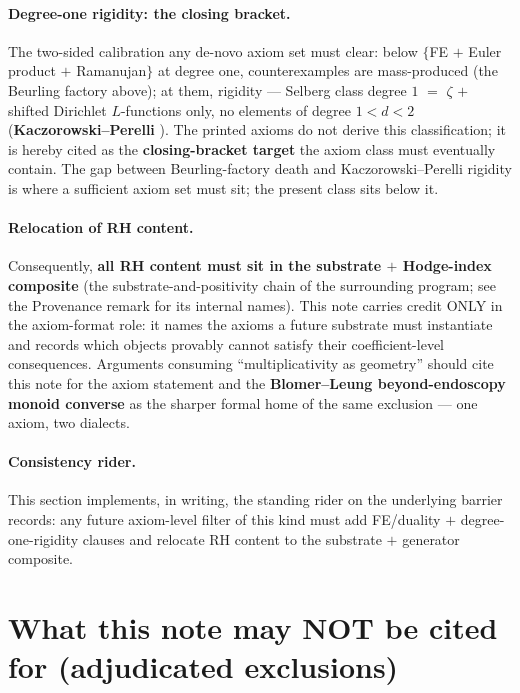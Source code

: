 \documentclass[11pt]{article}
\theoremstyle{plain}
\theoremstyle{definition}
\theoremstyle{remark}
\begin{document}
\paragraph{Degree-one rigidity: the closing bracket.} The two-sided
calibration any de-novo axiom set must clear: below $\{$FE $+$ Euler product
$+$ Ramanujan$\}$ at degree one, counterexamples are mass-produced (the
Beurling factory above); at them, rigidity --- Selberg class degree $1$ $=$
$\zeta$ $+$ shifted Dirichlet $L$-functions only, no elements of degree
$1 < d < 2$ (\textbf{Kaczorowski--Perelli} \cite{KP1, KP7}). The printed
axioms do not derive this classification; it is hereby cited as the
\textbf{closing-bracket target} the axiom class must eventually contain. The
gap between Beurling-factory death and Kaczorowski--Perelli rigidity is where
a sufficient axiom set must sit; the present class sits below it.

\paragraph{Relocation of RH content.} Consequently, \textbf{all RH content
must sit in the substrate $+$ Hodge-index composite} (the
substrate-and-positivity chain of the surrounding program; see the Provenance
remark for its internal names). This note carries credit ONLY in the axiom-format role: it
names the axioms a future substrate must instantiate and records which objects
provably cannot satisfy their coefficient-level consequences. Arguments
consuming ``multiplicativity as geometry'' should cite this note for the axiom
statement and the \textbf{Blomer--Leung beyond-endoscopy monoid converse}
\cite{BL} as the sharper formal home of the same exclusion --- one axiom, two
dialects.

\paragraph{Consistency rider.} This section implements, in writing, the
standing rider on the underlying barrier records: any future axiom-level
filter of this kind must add FE/duality $+$ degree-one-rigidity clauses and
relocate RH content to the substrate $+$ generator composite.

\section{What this note may NOT be cited for (adjudicated
exclusions)}\label{sec:notcite}
\end{document}
